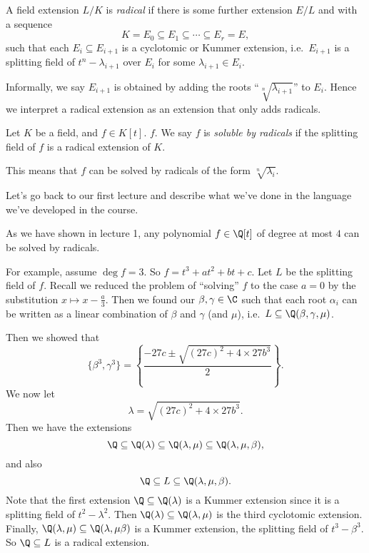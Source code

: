 \documentclass[a4paper]{article}
\begin{document}
\begin{defi}
  A field extension $L/K$ is \emph{radical} if there is some further extension $E/L$ and with a sequence
  \[
    K = E_0 \subseteq E_1 \subseteq \cdots \subseteq E_r = E,
  \]
  such that each $E_i \subseteq E_{i + 1}$ is a cyclotomic or Kummer extension, i.e.\ $E_{i + 1}$ is a splitting field of $t^n - \lambda_{i + 1}$ over $E_i$ for some $\lambda_{i + 1} \in E_i$.
\end{defi}
Informally, we say $E_{i + 1}$ is obtained by adding the roots ``$\sqrt[n]{\lambda_{i + 1}}$'' to $E_i$. Hence we interpret a radical extension as an extension that only adds radicals.

\begin{defi}
  Let $K$ be a field, and $f \in K[t]$. $f$. We say $f$ is \emph{soluble by radicals} if the splitting field of $f$ is a radical extension of $K$.
\end{defi}
This means that $f$ can be solved by radicals of the form $\sqrt[n]{\lambda_i}$.

Let's go back to our first lecture and describe what we've done in the language we've developed in the course.
\begin{eg}
  As we have shown in lecture 1, any polynomial $f \in \Q[t]$ of degree at most $4$ can be solved by radicals.

  For example, assume $\deg f = 3$. So $f = t^3 + a t^2 + bt + c$. Let $L$ be the splitting field of $f$. Recall we reduced the problem of ``solving'' $f$ to the case $a = 0$ by the substitution $x \mapsto x - \frac{a}{3}$. Then we found our $\beta, \gamma \in \C$ such that each root $\alpha_i$ can be written as a linear combination of $\beta$ and $\gamma$ (and $\mu$), i.e.\ $L \subseteq \Q(\beta, \gamma, \mu)$.

  Then we showed that
  \[
    \{\beta^3, \gamma^3\} = \left\{\frac{-27 c \pm \sqrt{(27c)^2 + 4\times 27b^3}}{2}\right\}.
  \]
  We now let
  \[
    \lambda = \sqrt{(27 c)^2 + 4\times 27 b^3}.
  \]
  Then we have the extensions
  \[
    \Q \subseteq \Q(\lambda) \subseteq \Q(\lambda, \mu) \subseteq \Q(\lambda, \mu, \beta),
  \]
  and also
  \[
    \Q \subseteq L \subseteq \Q(\lambda, \mu, \beta).
  \]
  Note that the first extension $\Q \subseteq \Q(\lambda)$ is a Kummer extension since it is a splitting field of $t^2 - \lambda^2$. Then $\Q(\lambda)\subseteq \Q(\lambda, \mu)$ is the third cyclotomic extension. Finally, $\Q(\lambda, \mu) \subseteq \Q(\lambda, \mu \beta)$ is a Kummer extension, the splitting field of $t^3 - \beta^3$. So $\Q \subseteq L$ is a radical extension.
\end{eg}
\end{document}
